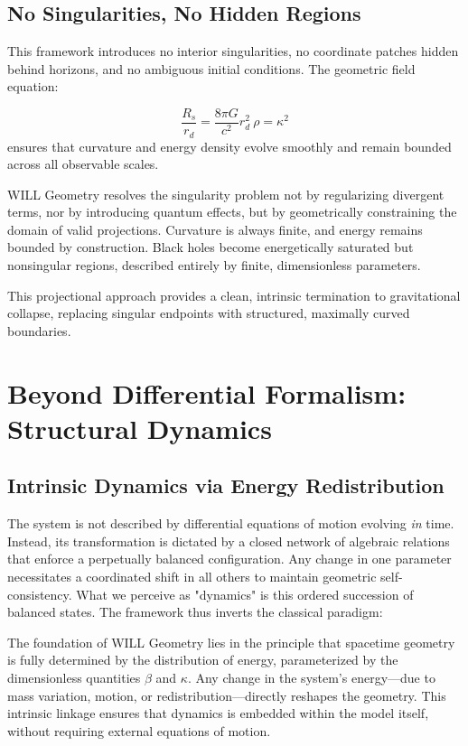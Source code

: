 \documentclass[12pt, a4paper]{article}
\begin{document}
\subsection{No Singularities, No Hidden Regions}

This framework introduces no interior singularities, no coordinate patches hidden behind horizons, and no ambiguous initial conditions. The geometric field equation:

\[
\frac{R_{s}}{r_{d}}=\frac{8\pi G}{c^{2}}r_{d}^{2}\ \rho=\kappa^{2}
\]
ensures that curvature and energy density evolve smoothly and remain bounded across all observable scales.

WILL Geometry resolves the singularity problem not by regularizing divergent terms, nor by introducing quantum effects, but by geometrically constraining the domain of valid projections. Curvature is always finite, and energy remains bounded by construction. Black holes become energetically saturated but nonsingular regions, described entirely by finite, dimensionless parameters.

This projectional approach provides a clean, intrinsic termination to gravitational collapse, replacing singular endpoints with structured, maximally curved boundaries.

\section{Beyond Differential Formalism: Structural Dynamics}

\subsection{Intrinsic Dynamics via Energy Redistribution}


The system is not described by differential equations of motion evolving \textit{in} time. Instead, its transformation is dictated by a closed network of algebraic relations that enforce a perpetually balanced configuration. Any change in one parameter necessitates a coordinated shift in all others to maintain geometric self-consistency. What we perceive as "dynamics" is this ordered succession of balanced states. The framework thus inverts the classical paradigm: 

The foundation of WILL Geometry lies in the principle that spacetime geometry is fully determined by the distribution of energy, parameterized by the dimensionless quantities \(\beta\) and \(\kappa\). Any change in the system's energy—due to mass variation, motion, or redistribution—directly reshapes the geometry. This intrinsic linkage ensures that dynamics is embedded within the model itself, without requiring external equations of motion.
\end{document}
